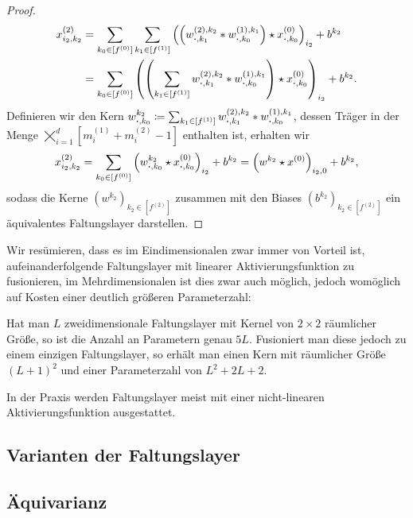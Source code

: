 \documentclass[paper=a4, 	%
		fontsize=11pt, 		%
		abstracton, 	%
		headsepline, 	%
		notitlepage	%
		]{scrartcl}
\theoremstyle{definition}
\newcommand{\fNat}[1]{[ #1 ]}
\begin{document}
\begin{proof}
    \begin{align*}
        x^{(2)}_{i_2,k_2} 
        &= \sum_{k_0\in \fNat{f^{(0)}}}\sum_{k_1\in \fNat{f^{(1)}}}  \left( \left( w^{(2),k_2}_{\bcdot,k_1} * 
        w^{(1),k_1}_{\bcdot,k_0}\right) \star x^{(0)}_{\bcdot,k_0}
        \right)_{i_2} + b^{k_2} \\
        &= \sum_{k_0\in \fNat{f^{(0)}}} \left( \left(
            \sum_{k_1\in \fNat{f^{(1)}}}  w^{(2),k_2}_{\bcdot,k_1} * 
        w^{(1),k_1}_{\bcdot,k_0}\right) \star x^{(0)}_{\bcdot,k_0}
        \right)_{i_2} + b^{k_2}.
    \end{align*}
    Definieren wir den Kern $w^{k_2}_{\bcdot, k_0} \coloneqq \sum_{k_1\in \fNat{f^{(1)}}}  w^{(2),k_2}_{\bcdot,k_1} * 
    w^{(1),k_1}_{\bcdot,k_0}$, dessen Träger in der Menge $\bigtimes_{i=1}^d \fNat{m^{(1)}_i + m^{(2)}_i - 1}$ enthalten ist, erhalten wir
    \[
        x^{(2)}_{i_2, k_2}
        = \sum_{k_0\in \fNat{f^{(0)}}} \left( w^{k_2}_{\bcdot, k_0}\star x^{(0)}_{\bcdot,k_0}
        \right)_{i_2} + b^{k_2}
        = \left( w^{k_2} \star x^{(0)} \right)_{i_2, 0} + b^{k_2},
    \]
    sodass die Kerne $(w^{k_2})_{k_2\in\fNat{f^{(2)}}}$ zusammen mit den Biases $(b^{k_2})_{k_2\in\fNat{f^{(2)}}}$ ein äquivalentes Faltungslayer darstellen.
\end{proof}

Wir resümieren, dass es im Eindimensionalen zwar immer von Vorteil ist, aufeinanderfolgende Faltungslayer mit linearer Aktivierungsfunktion zu fusionieren, im Mehrdimensionalen ist dies zwar auch möglich, jedoch womöglich auf Kosten einer deutlich größeren Parameterzahl:

Hat man $L$ zweidimensionale Faltungslayer mit Kernel von $2\times 2$ räumlicher Größe, so ist die Anzahl an Parametern genau $5L$.
Fusioniert man diese jedoch zu einem einzigen Faltungslayer, so erhält man einen Kern mit räumlicher Größe $(L+1)^2$ und einer Parameterzahl von $L^2 + 2L + 2$.

In der Praxis werden Faltungslayer meist mit einer nicht-linearen Aktivierungsfunktion ausgestattet.

\subsection{Varianten der Faltungslayer}



\subsection{Äquivarianz}
\end{document}
